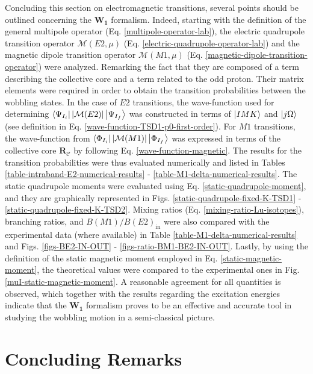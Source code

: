Concluding this section on electromagnetic transitions, several points should be outlined concerning the $\mathbf{W_1}$ formalism. Indeed, starting with the definition of the general multipole operator (Eq. \ref{multipole-operator-lab}), the electric quadrupole transition operator $\mathcal{M}(E2,\mu)$ (Eq. \ref{electric-quadrupole-operator-lab}) and the magnetic dipole transition operator $\mathcal{M}(M1,\mu)$ (Eq. \ref{magnetic-dipole-transition-operator}) were analyzed. Remarking the fact that they are composed of a term describing the collective core and a term related to the odd proton. Their matrix elements were required in order to obtain the transition probabilities between the wobbling states. In the case of $E2$ transitions, the wave-function used for determining $\bra{\Psi_{I_i}}|\mathcal{M}(E2)|\ket{\Psi_{I_f}}$ was constructed in terms of $\ket{IMK}$ and $\ket{j\Omega}$ (see definition in Eq. \ref{wave-function-TSD1-p0-first-order}). For $M1$ transitions, the wave-function from $\bra{\Phi_{I_i}}|\mathcal{M}(M1)|\ket{\Phi_{I_f}}$ was expressed in terms of the collective core $\mathbf{R}_\mathscr{C}$ by following Eq. \ref{wave-function-magnetic}. The results for the transition probabilities were thus evaluated numerically and listed in Tables \ref{table-intraband-E2-numerical-results} - \ref{table-M1-delta-numerical-results}. The static quadrupole moments were evaluated using Eq. \ref{static-quadrupole-moment}, and they are graphically represented in Figs. \ref{static-quadrupole-fixed-K-TSD1} - \ref{static-quadrupole-fixed-K-TSD2}. Mixing ratios (Eq. \ref{mixing-ratio-Lu-isotopes}), branching ratios, and $B(M1)/B(E2)_\text{in}$ were also compared with the experimental data (where available) in Table \ref{table-M1-delta-numerical-results} and Figs. \ref{figs-BE2-IN-OUT} - \ref{figs-ratio-BM1-BE2-IN-OUT}. Lastly, by using the definition of the static magnetic moment employed in Eq. \ref{static-magnetic-moment}, the theoretical values were compared to the experimental ones in Fig. \ref{muI-static-magnetic-moment}. A reasonable agreement for all quantities is observed, which together with the results regarding the excitation energies indicate that the $\mathbf{W_1}$ formalism proves to be an effective and accurate tool in studying the wobbling motion in a semi-classical picture.

\section{Concluding Remarks}
\label{c6-concluding-remarks}

